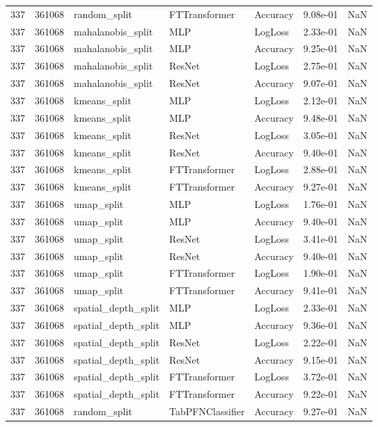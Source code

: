 \begin{tabular}{rrlllrr}
337 & 361068 & random\_split & FTTransformer & Accuracy & 9.08e-01 & NaN \\
337 & 361068 & mahalanobis\_split & MLP & LogLoss & 2.33e-01 & NaN \\
337 & 361068 & mahalanobis\_split & MLP & Accuracy & 9.25e-01 & NaN \\
337 & 361068 & mahalanobis\_split & ResNet & LogLoss & 2.75e-01 & NaN \\
337 & 361068 & mahalanobis\_split & ResNet & Accuracy & 9.07e-01 & NaN \\
337 & 361068 & kmeans\_split & MLP & LogLoss & 2.12e-01 & NaN \\
337 & 361068 & kmeans\_split & MLP & Accuracy & 9.48e-01 & NaN \\
337 & 361068 & kmeans\_split & ResNet & LogLoss & 3.05e-01 & NaN \\
337 & 361068 & kmeans\_split & ResNet & Accuracy & 9.40e-01 & NaN \\
337 & 361068 & kmeans\_split & FTTransformer & LogLoss & 2.88e-01 & NaN \\
337 & 361068 & kmeans\_split & FTTransformer & Accuracy & 9.27e-01 & NaN \\
337 & 361068 & umap\_split & MLP & LogLoss & 1.76e-01 & NaN \\
337 & 361068 & umap\_split & MLP & Accuracy & 9.40e-01 & NaN \\
337 & 361068 & umap\_split & ResNet & LogLoss & 3.41e-01 & NaN \\
337 & 361068 & umap\_split & ResNet & Accuracy & 9.40e-01 & NaN \\
337 & 361068 & umap\_split & FTTransformer & LogLoss & 1.90e-01 & NaN \\
337 & 361068 & umap\_split & FTTransformer & Accuracy & 9.41e-01 & NaN \\
337 & 361068 & spatial\_depth\_split & MLP & LogLoss & 2.33e-01 & NaN \\
337 & 361068 & spatial\_depth\_split & MLP & Accuracy & 9.36e-01 & NaN \\
337 & 361068 & spatial\_depth\_split & ResNet & LogLoss & 2.22e-01 & NaN \\
337 & 361068 & spatial\_depth\_split & ResNet & Accuracy & 9.15e-01 & NaN \\
337 & 361068 & spatial\_depth\_split & FTTransformer & LogLoss & 3.72e-01 & NaN \\
337 & 361068 & spatial\_depth\_split & FTTransformer & Accuracy & 9.22e-01 & NaN \\
337 & 361068 & random\_split & TabPFNClassifier & Accuracy & 9.27e-01 & NaN \\

\end{tabular}
